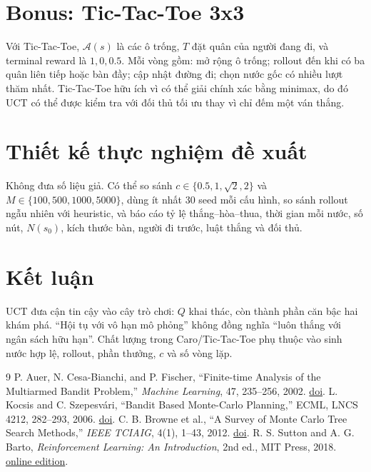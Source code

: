 \documentclass[conference]{IEEEtran}
\begin{document}
\section{Bonus: Tic-Tac-Toe 3x3}
Với Tic-Tac-Toe, $\mathcal A(s)$ là các ô trống, $T$ đặt quân của người đang đi,
và terminal reward là $1,0,0.5$. Mỗi vòng gồm: mở rộng ô trống; rollout đến khi
có ba quân liên tiếp hoặc bàn đầy; cập nhật đường đi; chọn nước gốc có nhiều lượt
thăm nhất. Tic-Tac-Toe hữu ích vì có thể giải chính xác bằng minimax, do đó UCT
có thể được kiểm tra với đối thủ tối ưu thay vì chỉ đếm một ván thắng.

\section{Thiết kế thực nghiệm đề xuất}
Không đưa số liệu giả. Có thể so sánh $c\in\{0.5,1,\sqrt2,2\}$ và
$M\in\{100,500,1000,5000\}$, dùng ít nhất 30 seed mỗi cấu hình, so sánh rollout
ngẫu nhiên với heuristic, và báo cáo tỷ lệ thắng--hòa--thua, thời gian mỗi nước,
số nút, $N(s_0)$, kích thước bàn, người đi trước, luật thắng và đối thủ.

\section{Kết luận}
UCT đưa cận tin cậy vào cây trò chơi: $Q$ khai thác, còn thành phần căn bậc hai
khám phá. ``Hội tụ với vô hạn mô phỏng'' không đồng nghĩa ``luôn thắng với ngân
sách hữu hạn''. Chất lượng trong Caro/Tic-Tac-Toe phụ thuộc vào sinh nước hợp lệ,
rollout, phần thưởng, $c$ và số vòng lặp.

\begin{thebibliography}{9}
 P. Auer, N. Cesa-Bianchi, and P. Fischer, ``Finite-time
Analysis of the Multiarmed Bandit Problem,'' \emph{Machine Learning}, 47,
235--256, 2002. \href{https://doi.org/10.1023/A:1013689704352}{doi}.
 L. Kocsis and C. Szepesvári, ``Bandit Based Monte-Carlo
Planning,'' ECML, LNCS 4212, 282--293, 2006.
\href{https://doi.org/10.1007/11871842_29}{doi}.
 C. B. Browne et al., ``A Survey of Monte Carlo Tree Search
Methods,'' \emph{IEEE TCIAIG}, 4(1), 1--43, 2012.
\href{https://doi.org/10.1109/TCIAIG.2012.2186810}{doi}.
 R. S. Sutton and A. G. Barto, \emph{Reinforcement Learning:
An Introduction}, 2nd ed., MIT Press, 2018.
\href{http://incompleteideas.net/book/the-book-2nd.html}{online edition}.
\end{thebibliography}
\end{document}
